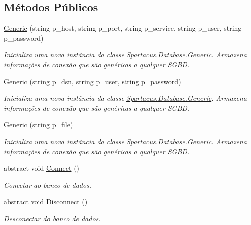 \subsection*{Métodos Públicos}
\begin{DoxyCompactItemize}
\item 
\hyperlink{classSpartacus_1_1Database_1_1Generic_a622b197eddc5c95c47c848a5820addca}{Generic} (string p\+\_\+host, string p\+\_\+port, string p\+\_\+service, string p\+\_\+user, string p\+\_\+password)
\begin{DoxyCompactList}\small\item\em Inicializa uma nova instância da classe \hyperlink{classSpartacus_1_1Database_1_1Generic}{Spartacus.\+Database.\+Generic}. Armazena informações de conexão que são genéricas a qualquer S\+G\+B\+D. \end{DoxyCompactList}\item 
\hyperlink{classSpartacus_1_1Database_1_1Generic_ae767e531163e6d35c9da13bf1a26da5b}{Generic} (string p\+\_\+dsn, string p\+\_\+user, string p\+\_\+password)
\begin{DoxyCompactList}\small\item\em Inicializa uma nova instância da classe \hyperlink{classSpartacus_1_1Database_1_1Generic}{Spartacus.\+Database.\+Generic}. Armazena informações de conexão que são genéricas a qualquer S\+G\+B\+D. \end{DoxyCompactList}\item 
\hyperlink{classSpartacus_1_1Database_1_1Generic_a135fa36ed3379d3e7360a44935d3507e}{Generic} (string p\+\_\+file)
\begin{DoxyCompactList}\small\item\em Inicializa uma nova instância da classe \hyperlink{classSpartacus_1_1Database_1_1Generic}{Spartacus.\+Database.\+Generic}. Armazena informações de conexão que são genéricas a qualquer S\+G\+B\+D. \end{DoxyCompactList}\item 
abstract void \hyperlink{classSpartacus_1_1Database_1_1Generic_a0f3940aeabde41676f15366e83eff166}{Connect} ()
\begin{DoxyCompactList}\small\item\em Conectar ao banco de dados. \end{DoxyCompactList}\item 
abstract void \hyperlink{classSpartacus_1_1Database_1_1Generic_a765dda5d5d8a768885fabd9799a0a180}{Disconnect} ()
\begin{DoxyCompactList}\small\item\em Desconectar do banco de dados. \end{DoxyCompactList}\item 

\end{DoxyCompactItemize}
